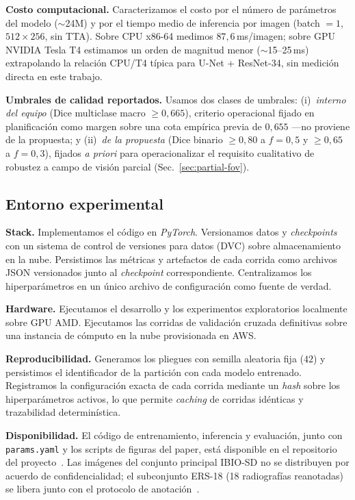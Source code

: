\documentclass[conference]{IEEEtran}
\begin{document}
\textbf{Costo computacional.} Caracterizamos el costo por el número de parámetros del modelo ($\sim$24M) y por el tiempo medio de inferencia por imagen (batch $=1$, $512{\times}256$, sin TTA). Sobre CPU x86-64 medimos $87{,}6$\,ms/imagen; sobre GPU NVIDIA Tesla T4 estimamos un orden de magnitud menor ($\sim$15--25\,ms) extrapolando la relación CPU/T4 típica para U-Net + ResNet-34, sin medición directa en este trabajo.

\textbf{Umbrales de calidad reportados.} Usamos dos clases de umbrales: (i)~\emph{interno del equipo} (Dice multiclase macro $\geq 0{,}665$), criterio operacional fijado en planificación como margen sobre una cota empírica previa de $0{,}655$ ---no proviene de la propuesta; y (ii)~\emph{de la propuesta} (Dice binario $\geq 0{,}80$ a $f=0{,}5$ y $\geq 0{,}65$ a $f=0{,}3$), fijados \emph{a priori} para operacionalizar el requisito cualitativo de robustez a campo de visión parcial (Sec.~\ref{sec:partial-fov}).

\subsection{Entorno experimental}
\label{sec:entorno}

\textbf{Stack.} Implementamos el código en \emph{PyTorch}. Versionamos datos y \emph{checkpoints} con un sistema de control de versiones para datos (DVC) sobre almacenamiento en la nube. Persistimos las métricas y artefactos de cada corrida como archivos JSON versionados junto al \emph{checkpoint} correspondiente. Centralizamos los hiperparámetros en un único archivo de configuración como fuente de verdad.

\textbf{Hardware.} Ejecutamos el desarrollo y los experimentos exploratorios localmente sobre GPU AMD. Ejecutamos las corridas de validación cruzada definitivas sobre una instancia de cómputo en la nube provisionada en AWS.

\textbf{Reproducibilidad.} Generamos los pliegues con semilla aleatoria fija ($42$) y persistimos el identificador de la partición con cada modelo entrenado. Registramos la configuración exacta de cada corrida mediante un \emph{hash} sobre los hiperparámetros activos, lo que permite \emph{caching} de corridas idénticas y trazabilidad determinística.

\textbf{Disponibilidad.} El código de entrenamiento, inferencia y evaluación, junto con \texttt{params.yaml} y los scripts de figuras del paper, está disponible en el repositorio del proyecto~\cite{project_repo}. Las imágenes del conjunto principal IBIO-SD no se distribuyen por acuerdo de confidencialidad; el subconjunto ERS-18 (18 radiografías reanotadas) se libera junto con el protocolo de anotación~\cite{ers18_protocol}.
\end{document}
